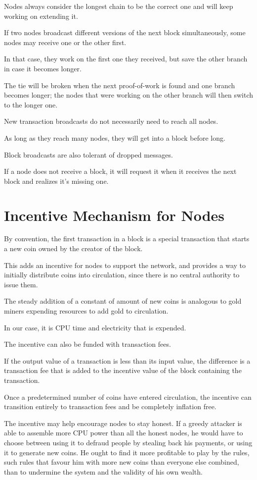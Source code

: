 \documentclass{article}
\begin{document}
Nodes always consider the longest chain to be the correct one and will keep working on extending it.

If two nodes broadcast different versions of the next block simultaneously, some nodes may receive one or the other first.

In that case, they work on the first one they received, but save the other branch in case it becomes longer.

The tie will be broken when the next proof-of-work is found and one branch becomes longer; the nodes that were working on the other branch will then switch to the longer one.

New transaction broadcasts do not necessarily need to reach all nodes.

As long as they reach many nodes, they will get into a block before long.

Block broadcasts are also tolerant of dropped messages.

If a node does not receive a block, it will request it when it receives the next block and realizes it's missing one.

\section{Incentive Mechanism for Nodes}

By convention, the first transaction in a block is a special transaction that starts a new coin owned by the creator of the block.

This adds an incentive for nodes to support the network, and provides a way to initially distribute coins into circulation, since there is no central authority to issue them.

The steady addition of a constant of amount of new coins is analogous to gold miners expending resources to add gold to circulation.

In our case, it is CPU time and electricity that is expended.

The incentive can also be funded with transaction fees.

If the output value of a transaction is less than its input value, the difference is a transaction fee that is added to the incentive value of the block containing the transaction.

Once a predetermined number of coins have entered circulation, the incentive can transition entirely to transaction fees and be completely inflation free.

The incentive may help encourage nodes to stay honest. If a greedy attacker is able to assemble more CPU power than all the honest nodes, he would have to choose between using it to defraud people by stealing back his payments, or using it to generate new coins. He ought to find it more profitable to play by the rules, such rules that favour him with more new coins than everyone else combined, than to undermine the system and the validity of his own wealth.
\end{document}
